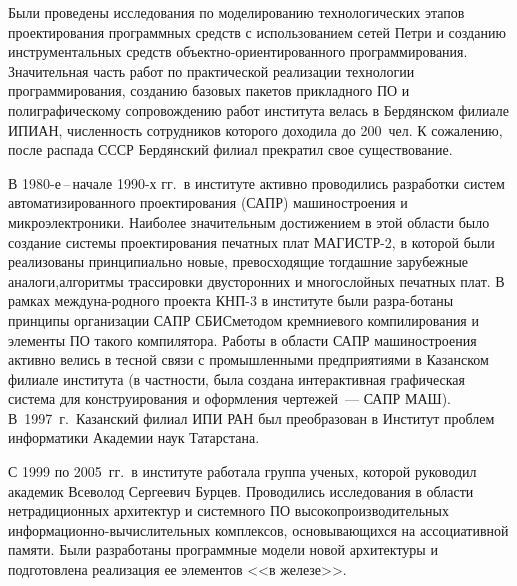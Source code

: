 \begin{multicols}{2}
{}

     Были проведены исследования по моделированию
технологических этапов проектирования программных средств с
использованием сетей Пет\-ри и созданию инструментальных средств
объ\-ект\-но-ори\-ен\-ти\-ро\-ван\-но\-го программирования. Значительная часть
работ по практической реализации технологии программирования,
созданию базовых %
пакетов прикладного ПО и полиграфическому
сопровождению работ института велась в Бердянском филиале
ИПИАН, численность сотрудников которого доходила до
200~чел. К сожалению, после распада СССР Бердянский филиал
прекратил свое существование.
{

}

     В 1980-е\,--\,начале 1990-х гг.\ в институте активно проводились
разработки сис\-тем автоматизированного проектирования (САПР) 
машиностроения и мик\-ро\-электроники. Наиболее
значительным достижением в этой области было создание системы
проектирования печатных плат МАГИСТР-2, в которой были
реализованы принципиально новые, превосходящие тогдашние
зарубежные аналоги,\linebreak алгоритмы трассировки двусторонних и
многослойных печатных плат. В рамках междуна-\linebreak родного проекта
КНП-3 в институте были разра-\linebreak ботаны принципы организации САПР
СБИС\linebreak  методом кремниевого компилирования и элементы
ПО такого компилятора. Работы в области
САПР машиностроения активно велись в тесной связи с
промышленными предприятиями в Казанском %
 филиале института (в
частности, была создана интерактивная графическая система для
конструирования и оформления чертежей~--- САПР МАШ). 
В~1997~г.\ Казанский филиал ИПИ РАН был преобразован в
Институт проблем информатики Академии наук Татарстана.

     С 1999 по 2005~гг.\ в институте работала группа ученых,
которой руководил академик Всеволод Сергеевич Бурцев.
Проводились исследования в области нетрадиционных архитектур и
системного ПО высокопроизводительных
ин\-фор\-ма\-цион\-но-вы\-чис\-ли\-тель\-ных комплексов, основывающихся на
ассоциативной памяти. Были разработаны программные модели
новой архитектуры и под\-го\-тов\-ле\-на реализация ее элементов <<в
железе>>.


\end{multicols}
